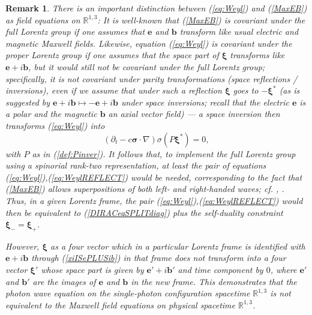 \documentclass[12pt]{article}
\theoremstyle{definition}
\newtheorem{rem}[thm]{Remark}
\newcommand{\refeq}[1]{(\ref{#1})}
\numberwithin{equation}{section}
\newcommand{\bb}{\mathbf{b}}
\newcommand{\be}{\mathbf{e}}
\newcommand{\beq}{\begin{equation}}
\newcommand{\eeq}{\end{equation}}
\newcommand{\p}{\partial}
\newcommand{\siV}{\boldsymbol{\sigma}}
\newcommand{\xiV}{{\boldsymbol{\xi}}}
\newcommand{\Rset}{{\mathbb R}}
\newcommand{\si}{\sigma}
\newcommand{\nab}{\nabla}
\begin{document}
\begin{rem}\textit{
There is an important distinction between \refeq{eq:Weyl} and \refeq{MaxEB} as field equations on $\Rset^{1,3}$:
  It is well-known that \refeq{MaxEB} is covariant under the {\em full} Lorentz group if one assumes that $\be$ and $\bb$
transform like usual electric and magnetic Maxwell fields.
 Likewise, equation \refeq{eq:Weyl} is covariant under the proper Lorentz group if one assumes that the space part of $\xiV$ 
transforms like $\be+i\bb$, but it would still not be covariant under the full Lorentz group; specifically, it is not covariant 
under parity transformations (space reflections / inversions), even if we assume that under such a reflection $\xiV$ goes to 
$-\xiV^\ast$ (as is suggested by $\be+i\bb\mapsto-\be +i\bb$ under space inversions; recall that the electric $\be$ is a polar 
and the magnetic $\bb$ an axial vector field) --- a space inversion then transforms (\ref{eq:Weyl}) into 
\beq \label{eq:WeylREFLECT}
(\p_t - c \siV\cdot\nab) \si(P\xiV^\ast) = 0,
\eeq 
with $P$ as in \refeq{def:Pinver}. It follows that, to implement the full Lorentz group using a spinorial rank-two representation,
at least the \emph{pair} of equations \refeq{eq:Weyl},\refeq{eq:WeylREFLECT} would be needed, corresponding to the fact that 
\refeq{MaxEB} allows superpositions of both left- and right-handed waves; cf. {\rm \cite{Pen1976}, \cite{IBBphotonREV}}.
 Thus, in a given Lorentz frame, the pair \refeq{eq:Weyl},\refeq{eq:WeylREFLECT} would then be equivalent
to (\ref{DIRACeqSPLITdiag}) \emph{plus the self-duality constraint} $\xiV_- =\xiV_+$.}

\textit{ \emph{However}, $\xiV$ as a \emph{four vector} which in a particular Lorentz frame is identified with $\be + i\bb$ 
through (\ref{xiISePLUSib}) in that frame does not transform into a four vector $\xiV'$ whose space part is given by $\be' +i\bb'$ 
and time component by $0$, where $\be'$ and $\bb'$ are the images of $\be$ and $\bb$ in the new frame.
 This demonstrates that the photon wave equation on the single-photon configuration spacetime $\Rset^{1,3}$ is \emph{not} 
equivalent to the Maxwell field equations on physical spacetime $\Rset^{1,3}$.}
\end{rem}

\end{document}
